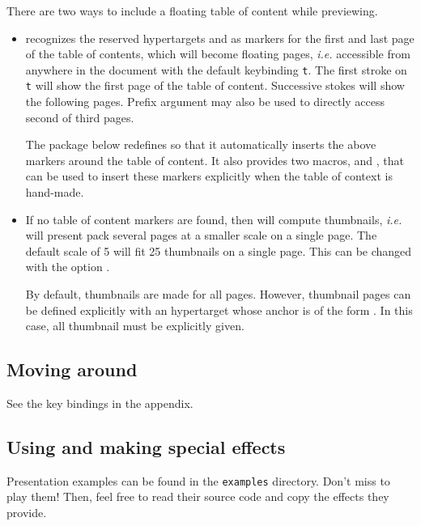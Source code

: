 \documentclass[12pt]{article}
\begin{document}
There are two ways to include a floating table of content while previewing. 
\begin {itemize}

\item
{\ActiveDVI} recognizes the reserved hypertargets 
and  as markers for the first and last page of the table
of contents, which will become floating pages, {\em i.e.} accessible from
anywhere in the document with the default keybinding \verb't'.
The first stroke on \verb't' will show the first page of the table of
content. Successive stokes will show the following pages. Prefix argument 
may also be used to directly access second of third pages. 

The package  below redefines
{\docdef \tableofcontents} so that it automatically inserts the above
markers around the table of content. It also provides two macros, {\docdef
\advitoc} and \docdef \endadvitoc, that can be used to insert these markers
explicitly when the table of context is hand-made.

\item
If no table of content markers are found, then {\ActiveDVI} will
compute thumbnails, {\em i.e.} will present pack several pages at a smaller 
scale on a single page. The default scale of 5 will fit 25 thumbnails on a
single page. This can be changed with the option . 

By default, thumbnails are made for all pages. However, thumbnail pages can
be defined explicitly with an hypertarget whose anchor is of the form
. In this case, all thumbnail must be explicitly
given.

\end {itemize}


\subsection {Moving around}

See the key bindings in the appendix.

\subsection {Using and making special effects}

Presentation examples can be found in the 
\verb"examples" directory. Don't miss to play them! Then, feel free
to read their source code and copy the effects they provide.
\end{document}
